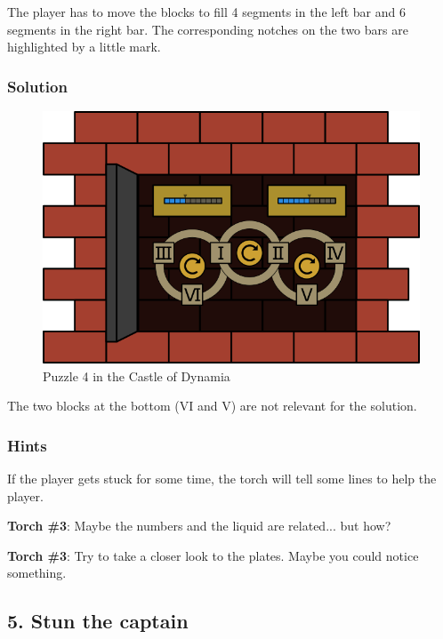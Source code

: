 The player has to move the blocks to fill 4 segments in the left bar and 6 segments in the right bar. The corresponding notches on the two bars are highlighted by a little mark.

\subsubsection*{Solution}

\begin{figure}[H]
  \centering
  \includegraphics[width=\textwidth]{Images/Puzzles/castleOfDynamia4Solution}
  \caption{Puzzle 4 in the Castle of Dynamia}
\end{figure}

The two blocks at the bottom (VI and V) are not relevant for the solution.

\subsubsection*{Hints}
If the player gets stuck for some time, the torch will tell some lines to help the player.


\textbf{Torch \#{}3}: Maybe the numbers and the liquid are related... but how?

\textbf{Torch \#{}3}: Try to take a closer look to the plates. Maybe you could notice something.


\subsection{5. Stun the captain}

